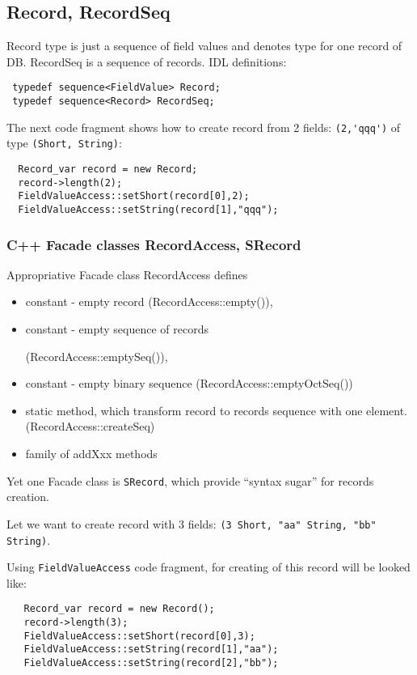 \documentclass[10pt]{article}
\begin{document}
\subsection{ Record, RecordSeq }
 Record type is just a sequence of field values and denotes type for one 
  record of DB. RecordSeq is a sequence of records.
 \newline
 IDL definitions:
\begin{verbatim}
 typedef sequence<FieldValue> Record;
 typedef sequence<Record> RecordSeq;
\end{verbatim}
 
The next code fragment shows how to create record from 2 fields: 
\verb|(2,'qqq')| of type \verb|(Short, String)|:
\begin{verbatim}
  Record_var record = new Record;
  record->length(2);
  FieldValueAccess::setShort(record[0],2);
  FieldValueAccess::setString(record[1],"qqq");
\end{verbatim}

\subsubsection{ C++ Facade classes RecordAccess, SRecord } 

  Appropriative Facade class RecordAccess defines
  \begin{itemize} 
    \item constant - empty record 
          (RecordAccess::empty()), 
    \item constant - empty sequence of records 

  (RecordAccess::emptySeq()), 
    \item constant - empty binary sequence (RecordAccess::emptyOctSeq())
    \item static method,
  which transform record to records sequence with one element.
    (RecordAccess::createSeq)
    \item family of addXxx methods
  \end{itemize} 

  Yet one Facade class is \verb|SRecord|, which provide ``syntax sugar''
  for records creation.

  Let we want to create record with 3 fields:
    \verb|(3 Short, "aa" String, "bb" String)|.

  Using \verb|FieldValueAccess| code fragment, for creating of this record
 will be looked like:
 \begin{verbatim}
   Record_var record = new Record();
   record->length(3);
   FieldValueAccess::setShort(record[0],3);
   FieldValueAccess::setString(record[1],"aa");
   FieldValueAccess::setString(record[2],"bb");
 \end{verbatim}
\end{document}
